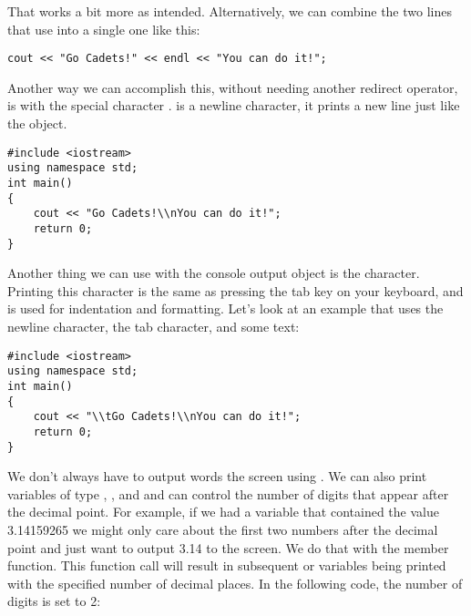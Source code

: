 \noindent {}

\noindent {}

That works a bit more as intended. 
Alternatively, we can combine the two lines that use  into a single one like this:

\begin{lstlisting}
cout << "Go Cadets!" << endl << "You can do it!";
\end{lstlisting}

Another way we can accomplish this, without needing another redirect operator, is with the special character .
 is a newline character, it prints a new line just like the  object. 

\begin{lstlisting}
#include <iostream>
using namespace std;
int main()
{
	cout << "Go Cadets!\\nYou can do it!";
	return 0;
}
\end{lstlisting}

\noindent {}

\noindent {}

Another thing we can use with the console output object is the  character. 
Printing this character is the same as pressing the tab key on your keyboard, and is used for indentation and formatting. 
Let's look at an example that uses the newline character, the tab character, and some text:

\begin{lstlisting}
#include <iostream>
using namespace std;
int main()
{
	cout << "\\tGo Cadets!\\nYou can do it!";
	return 0;
}
\end{lstlisting}


\noindent {}

We don't always have to output words the screen using . 
We can also print variables of type , , and  and can control the number of digits that appear after the decimal point. 
For example, if we had a variable that contained the value 3.14159265 we might only care about the first two numbers after the decimal point and just want to output 3.14 to the screen. 
We do that with the  member function. 
This function call will result in subsequent  or  variables being printed with the specified number of decimal places. 
In the following code, the number of digits is set to 2:


